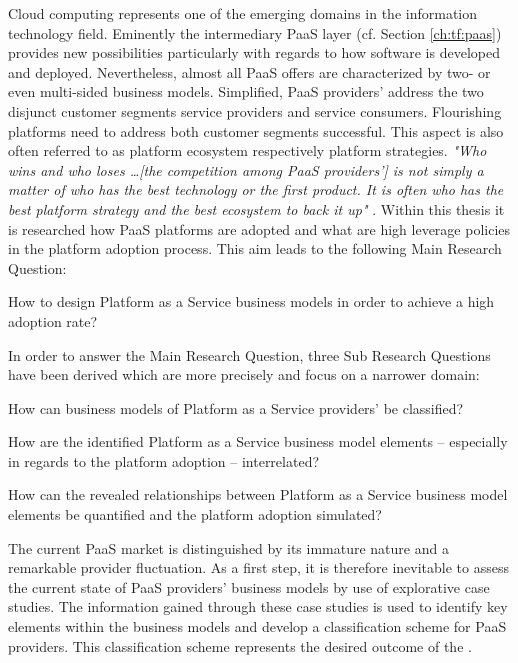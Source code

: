 Cloud computing represents one of the emerging domains in the information technology field. Eminently the intermediary \ac{PaaS} layer (cf. Section \ref{ch:tf:paas}) provides new possibilities particularly with regards to how software is developed and deployed. Nevertheless, almost all \ac{PaaS} offers are characterized by two- or even multi-sided business models. Simplified, \ac{PaaS} providers' address the two disjunct customer segments service providers and service consumers. Flourishing platforms need to address both customer segments successful. This aspect is also often referred to as platform ecosystem respectively platform strategies. \textit{"Who wins and who loses \ldots [the competition among \ac{PaaS} providers'] is not simply a matter of who has the best technology or the first product. It is often who has the best platform strategy and the best ecosystem to back it up"} \citep[p. 34]{Cusumano2010}. Within this thesis it is researched how \ac{PaaS} platforms are adopted and what are high leverage policies in the platform adoption process. This aim leads to the following Main Research Question:

\begin{MRQ}\label{mrq}
How to design Platform as a Service business models in order to achieve a high adoption rate?
\end{MRQ}

In order to answer the Main Research Question, three Sub Research Questions have been derived which are more precisely and focus on a narrower domain:

\begin{SRQ}\label{srq1}
How can business models of Platform as a Service providers' be classified?
\end{SRQ}

\begin{SRQ}\label{srq2}
How are the identified Platform as a Service business model elements -- especially in regards to the platform adoption -- interrelated?
\end{SRQ}

\begin{SRQ}\label{srq3}
How can the revealed relationships between Platform as a Service business model elements be quantified and the platform adoption simulated?
\end{SRQ}

The current \ac{PaaS} market is distinguished by its immature nature and a remarkable provider fluctuation. As a first step, it is therefore inevitable to assess the current state of \ac{PaaS} providers' business models by use of explorative case studies. The information gained through these case studies is used to identify key elements within the business models and develop a classification scheme for \ac{PaaS} providers. This classification scheme represents the desired outcome of the . 

